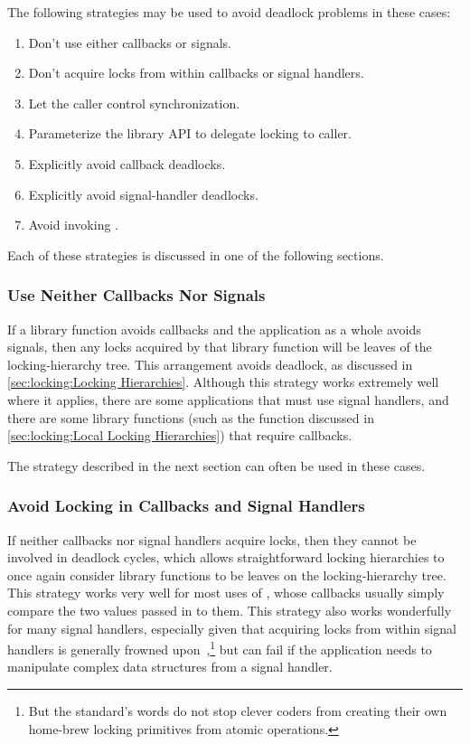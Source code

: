 The following strategies may be used to avoid deadlock problems in these cases:

\begin{enumerate}
\item	Don't use either callbacks or signals.
\item	Don't acquire locks from within callbacks or signal handlers.
\item	Let the caller control synchronization.
\item	Parameterize the library API to delegate locking to caller.
\item	Explicitly avoid callback deadlocks.
\item	Explicitly avoid signal-handler deadlocks.
\item	Avoid invoking .
\end{enumerate}

Each of these strategies is discussed in one of the following sections.

\subsubsection{Use Neither Callbacks Nor Signals}
\label{sec:locking:Use Neither Callbacks Nor Signals}

If a library function avoids callbacks and the application as a whole
avoids signals, then any locks acquired by that library function will
be leaves of the locking-hierarchy tree.
This arrangement avoids deadlock, as discussed in
\cref{sec:locking:Locking Hierarchies}.
Although this strategy works extremely well where it applies,
there are some applications that must use signal handlers,
and there are some library functions (such as the  function
discussed in
\cref{sec:locking:Local Locking Hierarchies})
that require callbacks.

The strategy described in the next section can often be used in these cases.

\subsubsection{Avoid Locking in Callbacks and Signal Handlers}
\label{sec:locking:Avoid Locking in Callbacks and Signal Handlers}

If neither callbacks nor signal handlers acquire locks, then they
cannot be involved in deadlock cycles, which allows straightforward
locking hierarchies to once again consider library functions to
be leaves on the locking-hierarchy tree.
This strategy works very well for most uses of , whose
callbacks usually simply compare the two values passed in to them.
This strategy also works wonderfully for many signal handlers,
especially given that acquiring locks from within signal handlers
is generally frowned upon~\cite{TheOpenGroup1997SUS},\footnote{
	But the standard's words do not stop clever coders from creating
	their own home-brew locking primitives from atomic operations.}
but can fail if the application needs to manipulate complex data structures
from a signal handler.

